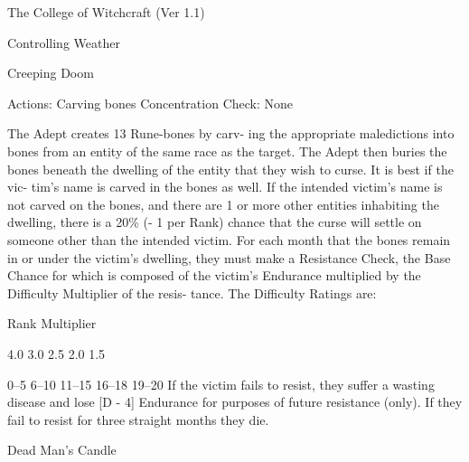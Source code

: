 \begin{Chapter}{The College of Witchcraft (Ver 1.1)}
\begin{ritual}[R-1]{Controlling Weather }
\begin{effects}
\end{effects}
\end{ritual}

\begin{ritual}[R-2]{Creeping Doom }

Actions: Carving bones 
Concentration Check: None 
\begin{effects}
The Adept creates 13 Rune-bones by carv-
ing  the  appropriate  maledictions  into  bones  from 
an entity of the same race as the target. The Adept 
then  buries  the  bones  beneath  the  dwelling  of  the 
entity  that  they  wish  to  curse.  It  is  best  if  the  vic-
tim’s  name  is  carved  in  the  bones  as  well.  If  the 
intended victim’s name is not carved on the bones, 
and there are 1 or more other entities inhabiting the 
dwelling, there is a 20\% (- 1 per Rank) chance that 
the  curse  will  settle  on  someone  other  than  the 
intended  victim.  For  each  month  that  the  bones 
remain in or under the victim’s dwelling, they must 
make  a  Resistance  Check,  the  Base  Chance  for 
which  is  composed  of  the  victim’s  Endurance 
multiplied by the Difficulty Multiplier of the resis-
tance. The Difficulty Ratings are: 

Rank  Multiplier 

4.0 
3.0 
2.5 
2.0 
1.5 

0–5 
6–10 
11–15 
16–18 
19–20 
If  the  victim  fails  to  resist,  they  suffer  a  wasting 
disease and lose [D - 4] Endurance for purposes of 
future  resistance  (only).  If  they  fail  to  resist  for 
three straight months they die. 
\end{effects}
\end{ritual}

\begin{ritual}[R-3]{Dead Man’s Candle}


\end{ritual}
\end{Chapter}
